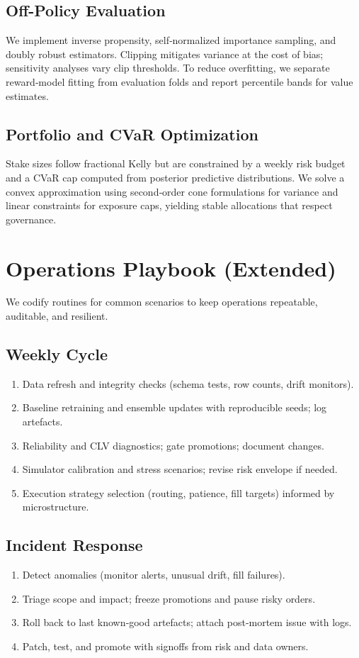 \documentclass[12pt]{report}  %
\numberwithin{equation}{section}
\theoremstyle{plain}
\theoremstyle{definition}
\theoremstyle{remark}
\begin{document}
\section{Off-Policy Evaluation}
We implement inverse propensity, self‑normalized importance sampling, and doubly robust estimators. Clipping mitigates variance at the cost of bias; sensitivity analyses vary clip thresholds. To reduce overfitting, we separate reward‑model fitting from evaluation folds and report percentile bands for value estimates.

\section{Portfolio and CVaR Optimization}
Stake sizes follow fractional Kelly but are constrained by a weekly risk budget and a CVaR cap computed from posterior predictive distributions. We solve a convex approximation using second‑order cone formulations for variance and linear constraints for exposure caps, yielding stable allocations that respect governance.

\chapter{Operations Playbook (Extended)}
We codify routines for common scenarios to keep operations repeatable, auditable, and resilient.

\section{Weekly Cycle}
\begin{enumerate}
  \item Data refresh and integrity checks (schema tests, row counts, drift monitors).
  \item Baseline retraining and ensemble updates with reproducible seeds; log artefacts.
  \item Reliability and CLV diagnostics; gate promotions; document changes.
  \item Simulator calibration and stress scenarios; revise risk envelope if needed.
  \item Execution strategy selection (routing, patience, fill targets) informed by microstructure.
\end{enumerate}

\section{Incident Response}
\begin{enumerate}
  \item Detect anomalies (monitor alerts, unusual drift, fill failures).
  \item Triage scope and impact; freeze promotions and pause risky orders.
  \item Roll back to last known‑good artefacts; attach post‑mortem issue with logs.
  \item Patch, test, and promote with signoffs from risk and data owners.
\end{enumerate}
\end{document}
